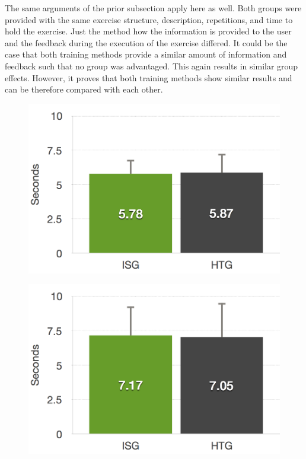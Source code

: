 The same arguments of the prior subsection \textit{} apply here as well.
Both groups were provided with the same exercise structure, description, repetitions, and time to hold the exercise.
Just the method how the information is provided to the user and the feedback during the execution of the exercise differed.
It could be the case that both training methods provide a similar amount of information and feedback such that no group was advantaged.
This again results in similar group effects.
However, it proves that both training methods show similar results and can be therefore compared with each other.
\begin{figure}[htb]
	\centering
	\begin{minipage}[t]{0.40\linewidth}
		\centering
		\includegraphics[width=1\linewidth]{Pictures/6_4_DIA_StandLeftGroupEffect}
		\label{fig:6_4_standLeftGroupEffect}
	\end{minipage}
	\hfill
	\begin{minipage}[t]{0.40\linewidth}
		\centering
		\includegraphics[width=1\linewidth]{Pictures/6_4_DIA_StandRightGroupEffect}

\end{minipage}
\end{figure}

